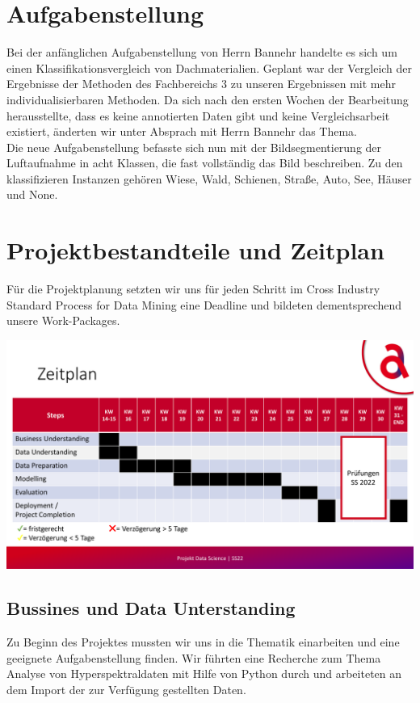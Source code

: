 \section{Aufgabenstellung}
Bei der anfänglichen Aufgabenstellung von Herrn Bannehr handelte es sich um einen Klassifikationsvergleich von Dachmaterialien.
Geplant war der Vergleich der Ergebnisse der Methoden des Fachbereichs 3 zu unseren Ergebnissen mit mehr individualisierbaren Methoden.
Da sich nach den ersten Wochen der Bearbeitung herausstellte, dass es keine annotierten Daten gibt und keine Vergleichsarbeit existiert,
änderten wir unter Absprach mit Herrn Bannehr das Thema.\\
Die neue Aufgabenstellung befasste sich nun mit der Bildsegmentierung der Luftaufnahme in acht Klassen, die fast vollständig
das Bild beschreiben. Zu den klassifizieren Instanzen gehören Wiese, Wald, Schienen, Straße, Auto, See, Häuser und None.

\section{Projektbestandteile und Zeitplan}
Für die Projektplanung setzten wir uns für jeden Schritt im Cross Industry Standard Process for Data Mining eine Deadline
und bildeten dementsprechend unsere Work-Packages.

\begin{center}
\includegraphics[width=15cm]{../../data/Zeitplan}
\end{center}

\subsection{Bussines und Data Unterstanding}
Zu Beginn des Projektes mussten wir uns in die Thematik einarbeiten und eine geeignete Aufgabenstellung finden.
Wir führten eine Recherche zum Thema \glqq Analyse von Hyperspektraldaten mit Hilfe von Python\grqq{}  durch und arbeiteten an
dem Import der zur Verfügung gestellten Daten.

